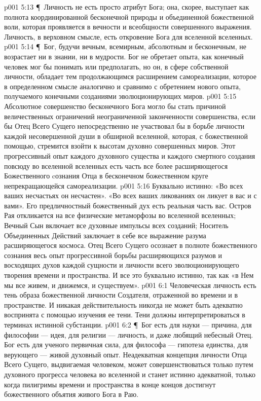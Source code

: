 \vs p001 5:13 \P\ Личность не есть просто атрибут Бога; она, скорее, выступает как полнота координированной бесконечной природы и объединенной божественной воли, которая проявляется в вечности и всеобщности совершенного выражения. Личность, в верховном смысле, есть откровение Бога для вселенной вселенных.
\vs p001 5:14 \P\ Бог, будучи вечным, всемирным, абсолютным и бесконечным, не возрастает ни в знании, ни в мудрости. Бог не обретает опыта, как конечный человек мог бы понимать или предполагать, но он, в сфере собственной личности, обладает тем продолжающимся расширением самореализации, которое в определенном смысле аналогично и сравнимо с обретением нового опыта, получаемого конечными созданиями эволюционирующих миров.
\vs p001 5:15 Абсолютное совершенство бесконечного Бога могло бы стать причиной величественных ограничений неограниченной законченности совершенства, если бы Отец Всего Сущего непосредственно не участвовал бы в борьбе личности каждой несовершенной души в обширной вселенной, которая, с божественной помощью, стремится взойти к высотам духовно совершенных миров. Этот прогрессивный опыт каждого духовного существа и каждого смертного создания повсюду во вселенной вселенных есть часть все более расширяющегося Божественного cознания Отца в бесконечном божественном круге непрекращающейся самореализации.
\vs p001 5:16 Буквально истинно: «Во всех ваших несчастьях он несчастен». «Во всех ваших ликованиях он ликует в вас и с вами». Его предличностный божественный дух есть реальная часть вас. Остров Рая откликается на все физические метаморфозы во вселенной вселенных; Вечный Сын включает все духовные импульсы всех созданий; Носитель Объединенных Действий заключает в себе все выражение разума расширяющегося космоса. Отец Всего Сущего осознает в полноте божественного сознания весь опыт прогрессивной борьбы расширяющихся разумов и восходящих духов каждой сущности и личности всего эволюционирующего творения времени и пространства. И все это буквально истинно, так как «в Нем мы все живем, и движемся, и существуем».
\vs p001 6:1 Человеческая личность есть тень образа божественной личности Создателя, отраженной во времени и в пространстве. И никакая действительность никогда не может быть адекватно воспринята с помощью изучения ее тени. Тени должны интерпретироваться в терминах истинной субстанции.
\vs p001 6:2 \P\ Бог есть для науки --- причина, для философии --- идея, для религии --- личность, и даже любящий небесный Отец. Бог есть для ученого первичная сила, для философа --- гипотеза единства, для верующего --- живой духовный опыт. Неадекватная концепция личности Отца Всего Сущего, выдвигаемая человеком, может совершенствоваться только путем духовного прогресса человека во вселенной и станет истинно адекватной, только когда пилигримы времени и пространства в конце концов достигнут божественного объятия живого Бога в Раю.
